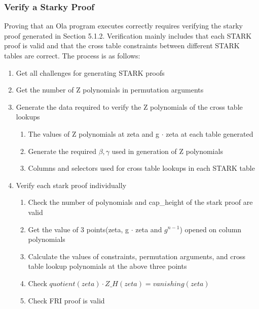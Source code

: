 \subsubsection{Verify a Starky Proof}\label{section: starky-verify-proof}

Proving that an Ola program executes correctly requires verifying the starky proof generated in Section 5.1.2. Verification mainly includes that each STARK proof is valid and that the cross table constraints between different STARK tables are correct. The process is as follows:

\begin{enumerate}
    \item Get all challenges for generating STARK proofs
    \item Get the number of Z polynomials  in permutation arguments
    \item Generate the data required to verify the Z polynomials of the cross table lookups
        \begin{enumerate}
            \item The values of Z polynomials at zeta and g $\cdot$ zeta at each table generated
            \item Generate the required $\beta, \gamma$ used in generation of Z polynomials
            \item Columns and selectors used for cross table lookups in each STARK table
        \end{enumerate}
    \item Verify each stark proof individually
        \begin{enumerate}
            \item Check the number of polynomials and cap\_height of the stark proof are valid
            \item Get the value of 3 points(zeta, g $\cdot$ zeta and $g^{n-1}$) opened on column polynomials
            \item Calculate the values of constraints, permutation arguments, and cross table lookup polynomials at the above three points
            \item Check $quotient(zeta) \cdot Z\_H(zeta) = vanishing(zeta)$
            \item Check FRI proof is valid
        \end{enumerate}
\end{enumerate}
